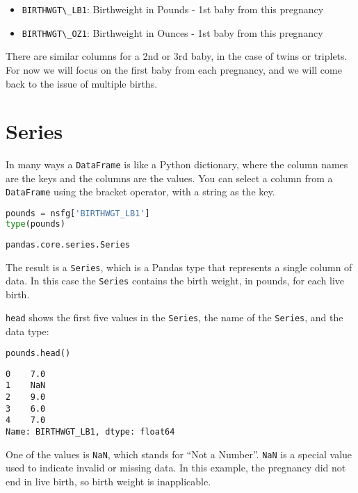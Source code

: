 \begin{itemize}
\item
  \passthrough{\lstinline!BIRTHWGT\_LB1!}: Birthweight in Pounds - 1st
  baby from this pregnancy
\item
  \passthrough{\lstinline!BIRTHWGT\_OZ1!}: Birthweight in Ounces - 1st
  baby from this pregnancy
\end{itemize}

There are similar columns for a 2nd or 3rd baby, in the case of twins or
triplets. For now we will focus on the first baby from each pregnancy,
and we will come back to the issue of multiple births.

\hypertarget{series}{%
\section{Series}\label{series}}

In many ways a \passthrough{\lstinline!DataFrame!} is like a Python
dictionary, where the column names are the keys and the columns are the
values. You can select a column from a
\passthrough{\lstinline!DataFrame!} using the bracket operator, with a
string as the key.

\begin{lstlisting}[language=Python,style=source]
pounds = nsfg['BIRTHWGT_LB1']
type(pounds)
\end{lstlisting}

\begin{lstlisting}[style=output]
pandas.core.series.Series
\end{lstlisting}

The result is a \passthrough{\lstinline!Series!}, which is a Pandas type
that represents a single column of data. In this case the
\passthrough{\lstinline!Series!} contains the birth weight, in pounds,
for each live birth.

\passthrough{\lstinline!head!} shows the first five values in the
\passthrough{\lstinline!Series!}, the name of the
\passthrough{\lstinline!Series!}, and the data type:

\begin{lstlisting}[language=Python,style=source]
pounds.head()
\end{lstlisting}

\begin{lstlisting}[style=output]
0    7.0
1    NaN
2    9.0
3    6.0
4    7.0
Name: BIRTHWGT_LB1, dtype: float64
\end{lstlisting}

One of the values is \passthrough{\lstinline!NaN!}, which stands for
``Not a Number''. \passthrough{\lstinline!NaN!} is a special value used
to indicate invalid or missing data. In this example, the pregnancy did
not end in live birth, so birth weight is inapplicable.

